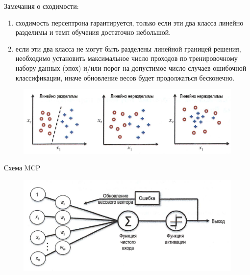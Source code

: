 \documentclass{beamer}
\begin{document}
\begin{frame}[t]
Замечания о сходимости:
\begin{enumerate}
\item сходимость персептрона гарантируется, только если эти два класса линейно разделимы и темп обучения достаточно небольшой. 
\item если эти два класса не могут быть разделены линейной границей решения, необходимо установить максимальное число проходов по тренировочному набору данных (эпох) и/или порог на допустимое число случаев ошибочной классификации, иначе обновление весов будет продолжаться бесконечно.
\end{enumerate}
\begin{figure}[h]
\centering
\includegraphics[scale=0.35]{images/lec03-pic08.png}
\end{figure}
\end{frame}

\begin{frame}[t]{Схема MCP}
\begin{figure}[h]
\centering
\includegraphics[scale=0.4]{images/lec03-pic09.png}
\end{figure}
\end{frame}
\end{document}
